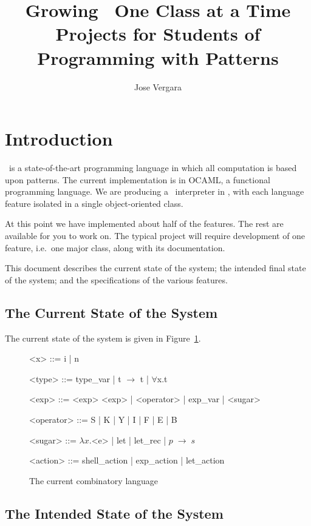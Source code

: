 \documentclass[12pt]{article}
\title{Growing \bondi\ One Class at a Time \\
Projects for Students of Programming with Patterns }
\author{Jose Vergara}
\date{}
\begin{document}
\maketitle
\makeatactive

\section{Introduction}

\bondi\ is a state-of-the-art programming language in which all
computation is based upon patterns. The current implementation is in
OCAML, a functional programming language. We are producing a \bondi\
interpreter in \bondi, with each language feature isolated in a single
object-oriented class. 

At this point we have implemented about half of the features. The rest
are available for you to work on. The typical project will require
development of one feature, i.e.\ one major class, along with its
documentation. 

This document describes the current state of the system; the intended
final state of the system; and the specifications of the various
features. 

\subsection{The Current State of the System}

The current state of the system is given in Figure~\ref{fig:comblang}.

\begin{figure}
  \begin{grammar}
<x> ::= i | n

<type> ::= type_var | t $\rightarrow$ t  | $\forall$x.t 

<exp> ::= <exp> <exp> | <operator> | exp_var | <sugar> 

<operator> ::= S | K | Y | I | F | E | B 

<sugar> ::= $\lambda x.$<e> | let  | let_rec | $p \; \rightarrow \; s$

<action> ::= shell_action | exp_action | let_action
\end{grammar}
\caption{The current combinatory language}
\label{fig:comblang}
\end{figure}


\subsection{The Intended State of the System}
\end{document}
